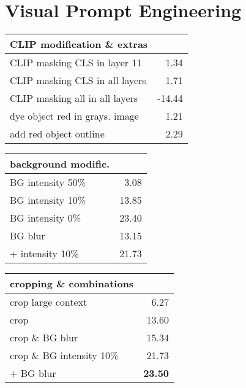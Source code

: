 \documentclass[10pt,twocolumn,letterpaper]{article}
\begin{document}
\section{Visual Prompt Engineering}

\label{sec:prompt_engineering}


\begin{table*}
    \centering
    \footnotesize
    \begin{tabular}{lr}
        \toprule
         CLIP modification \& extras &  \\
         \midrule
CLIP masking CLS in layer 11 & 1.34 \\
CLIP masking CLS in all layers & 1.71 \\
CLIP masking all in all layers & -14.44 \\
dye object red in grays. image & 1.21 \\
add red object outline & 2.29 \\
         \bottomrule
    \end{tabular}
    \hspace{0.5cm}
    \begin{tabular}{lr}
        \toprule
        background modific. &  \\
         \midrule
BG intensity 50\% & 3.08 \\
BG intensity 10\% & 13.85 \\
BG intensity 0\% & 23.40 \\
BG blur & 13.15 \\
+ intensity 10\% & 21.73 \\
         \bottomrule
    \end{tabular} 
    \hspace{0.5cm}
    \begin{tabular}{lr}
        \toprule
         cropping \& combinations &  \\
         \midrule
crop large context & 6.27 \\
crop & 13.60 \\
crop \& BG blur & 15.34 \\
crop \& BG intensity 10\% & 21.73 \\
+ BG blur & \textbf{23.50} \\
         \bottomrule
    \end{tabular}        
    \caption{Visual prompt engineering: Average improvement of object probability for different forms of combining image and mask over 1,600 samples. Cropping means cutting the image according to the regions specified by the mask, ``BG'' means background.}
    \label{tab:prompt_engineering_short}
\end{table*}
\end{document}
